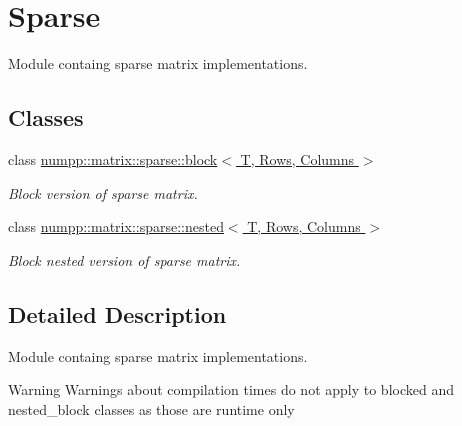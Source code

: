 \hypertarget{group__numpp__structures__matrices__sparse}{}\section{Sparse}
\label{group__numpp__structures__matrices__sparse}


Module containg sparse matrix implementations.  


\subsection*{Classes}
\begin{DoxyCompactItemize}
\item 
class \hyperlink{classnumpp_1_1matrix_1_1sparse_1_1block}{numpp\+::matrix\+::sparse\+::block$<$ T, Rows, Columns $>$}
\begin{DoxyCompactList}\small\item\em Block version of sparse matrix. \end{DoxyCompactList}\item 
class \hyperlink{classnumpp_1_1matrix_1_1sparse_1_1nested}{numpp\+::matrix\+::sparse\+::nested$<$ T, Rows, Columns $>$}
\begin{DoxyCompactList}\small\item\em Block nested version of sparse matrix. \end{DoxyCompactList}\end{DoxyCompactItemize}


\subsection{Detailed Description}
Module containg sparse matrix implementations. 

\begin{DoxyWarning}{Warning}
Warnings about compilation times do not apply to blocked and nested\+\_\+block classes as those are runtime only 
\end{DoxyWarning}
